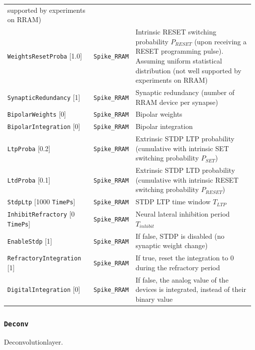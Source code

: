 \documentclass[a4paper,11pt,oneside]{article}
\begin{document}
\begin{center}
\begin{longtable}{| p{4cm} | p{3cm} | p{9cm} | }
   supported by experiments on RRAM) \\
  \lstinline!WeightsResetProba! [1.0] & \lstinline!Spike_RRAM!
  & Intrinsic RESET switching probability $P_{RESET}$ (upon receiving a RESET
  programming pulse). Assuming uniform statistical distribution (not well
  supported by experiments on RRAM) \\
  \lstinline!SynapticRedundancy! [1] & \lstinline!Spike_RRAM!
  & Synaptic redundancy (number of RRAM device per synapse) \\
  \cellcolor{expercolor}\lstinline!BipolarWeights! [0] & \lstinline!Spike_RRAM!
  & Bipolar weights \\
  \cellcolor{expercolor}\lstinline!BipolarIntegration! [0]
  & \lstinline!Spike_RRAM! & Bipolar integration \\
  \cellcolor{expercolor}\lstinline!LtpProba! [0.2] & \lstinline!Spike_RRAM!
  & Extrinsic STDP LTP probability (cumulative with intrinsic SET switching
  probability $P_{SET}$) \\
  \cellcolor{expercolor}\lstinline!LtdProba! [0.1] & \lstinline!Spike_RRAM!
  & Extrinsic STDP LTD probability (cumulative with intrinsic RESET switching
   probability $P_{RESET}$) \\
  \cellcolor{expercolor}\lstinline!StdpLtp! [1000 \lstinline!TimePs!] & \lstinline!Spike_RRAM! & STDP LTP time window $T_{LTP}$ \\
  \cellcolor{expercolor}\lstinline!InhibitRefractory! [0 \lstinline!TimePs!] & \lstinline!Spike_RRAM! & Neural lateral inhibition period $T_{inhibit}$ \\
  \cellcolor{expercolor}\lstinline!EnableStdp! [1] & \lstinline!Spike_RRAM!
  & If false, STDP is disabled (no synaptic weight change) \\
  \cellcolor{expercolor}\lstinline!RefractoryIntegration! [1]
   & \lstinline!Spike_RRAM! & If true, reset the integration to 0 during
   the refractory period \\
  \cellcolor{expercolor}\lstinline!DigitalIntegration! [0]
  & \lstinline!Spike_RRAM! & If false, the analog value of the devices is
  integrated, instead of their binary value \\
 \hline
\end{longtable}
\end{center}
\subsubsection{\texorpdfstring{%
\lstinline[basicstyle=\ttfamily\bfseries]!Deconv!}{Deconv}}
Deconvolutionlayer.
\end{document}
